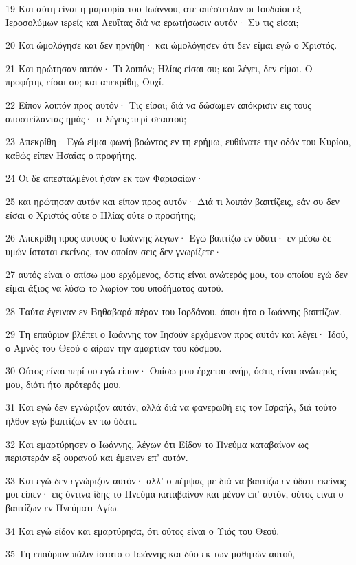 \par 19 Και αύτη είναι η μαρτυρία του Ιωάννου, ότε απέστειλαν οι Ιουδαίοι εξ Ιεροσολύμων ιερείς και Λευΐτας διά να ερωτήσωσιν αυτόν· Συ τις είσαι;
\par 20 Και ώμολόγησε και δεν ηρνήθη· και ώμολόγησεν ότι δεν είμαι εγώ ο Χριστός.
\par 21 Και ηρώτησαν αυτόν· Τι λοιπόν; Ηλίας είσαι συ; και λέγει, δεν είμαι. Ο προφήτης είσαι συ; και απεκρίθη, Ουχί.
\par 22 Είπον λοιπόν προς αυτόν· Τις είσαι; διά να δώσωμεν απόκρισιν εις τους αποστείλαντας ημάς· τι λέγεις περί σεαυτού;
\par 23 Απεκρίθη· Εγώ είμαι φωνή βοώντος εν τη ερήμω, ευθύνατε την οδόν του Κυρίου, καθώς είπεν Ησαΐας ο προφήτης.
\par 24 Οι δε απεσταλμένοι ήσαν εκ των Φαρισαίων·
\par 25 και ηρώτησαν αυτόν και είπον προς αυτόν· Διά τι λοιπόν βαπτίζεις, εάν συ δεν είσαι ο Χριστός ούτε ο Ηλίας ούτε ο προφήτης;
\par 26 Απεκρίθη προς αυτούς ο Ιωάννης λέγων· Εγώ βαπτίζω εν ύδατι· εν μέσω δε υμών ίσταται εκείνος, τον οποίον σεις δεν γνωρίζετε·
\par 27 αυτός είναι ο οπίσω μου ερχόμενος, όστις είναι ανώτερός μου, του οποίου εγώ δεν είμαι άξιος να λύσω το λωρίον του υποδήματος αυτού.
\par 28 Ταύτα έγειναν εν Βηθαβαρά πέραν του Ιορδάνου, όπου ήτο ο Ιωάννης βαπτίζων.
\par 29 Τη επαύριον βλέπει ο Ιωάννης τον Ιησούν ερχόμενον προς αυτόν και λέγει· Ιδού, ο Αμνός του Θεού ο αίρων την αμαρτίαν του κόσμου.
\par 30 Ούτος είναι περί ου εγώ είπον· Οπίσω μου έρχεται ανήρ, όστις είναι ανώτερός μου, διότι ήτο πρότερός μου.
\par 31 Και εγώ δεν εγνώριζον αυτόν, αλλά διά να φανερωθή εις τον Ισραήλ, διά τούτο ήλθον εγώ βαπτίζων εν τω ύδατι.
\par 32 Και εμαρτύρησεν ο Ιωάννης, λέγων ότι Είδον το Πνεύμα καταβαίνον ως περιστεράν εξ ουρανού και έμεινεν επ' αυτόν.
\par 33 Και εγώ δεν εγνώριζον αυτόν· αλλ' ο πέμψας με διά να βαπτίζω εν ύδατι εκείνος μοι είπεν· εις όντινα ίδης το Πνεύμα καταβαίνον και μένον επ' αυτόν, ούτος είναι ο βαπτίζων εν Πνεύματι Αγίω.
\par 34 Και εγώ είδον και εμαρτύρησα, ότι ούτος είναι ο Υιός του Θεού.
\par 35 Τη επαύριον πάλιν ίστατο ο Ιωάννης και δύο εκ των μαθητών αυτού,
